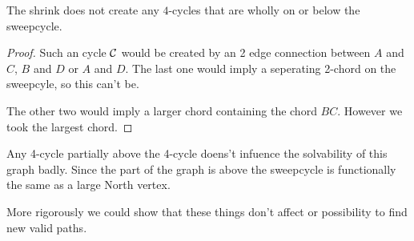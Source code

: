 \begin{lemma}
  \label{lm:}
  The shrink does not create any $4$-cycles that are wholly on or below the sweepcycle.
\end{lemma}

\begin{proof}
  Such an cycle $\mathcal{C}$ would be created by an 2 edge connection between $A$ and $C$, $B$ and $D$ or $A$ and $D$. The last one would imply a seperating 2-chord on the sweepcyle, so this can't be.

  The other two would imply a larger chord containing the chord $BC$. However we took the largest chord.
\end{proof}

Any 4-cycle partially above the 4-cycle doens't infuence the solvability of this graph badly. Since the part of the graph is above the sweepcycle is functionally the same as a large North vertex. 

More rigorously we could show that these things don't affect or possibility to find new valid paths.
